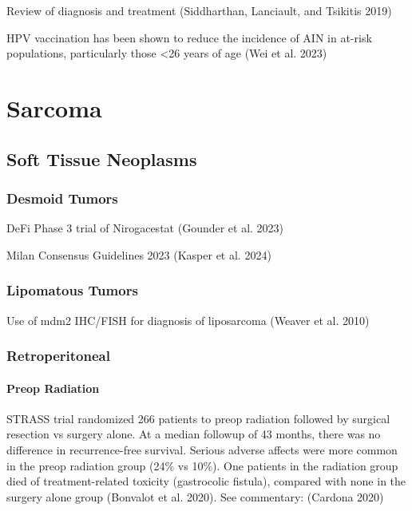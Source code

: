 \documentclass[
  letterpaper,
]{scrbook}
\begin{document}
Review of diagnosis and treatment (Siddharthan, Lanciault, and Tsikitis
2019)

HPV vaccination has been shown to reduce the incidence of AIN in at-risk
populations, particularly those \textless26 years of age (Wei et al.
2023)

\part{Sarcoma}

\chapter{Soft Tissue Neoplasms}\label{soft-tissue-neoplasms}

\section{Desmoid Tumors}\label{desmoid-tumors}

DeFi Phase 3 trial of Nirogacestat (Gounder et al. 2023)

Milan Consensus Guidelines 2023 (Kasper et al. 2024)

\section{Lipomatous Tumors}\label{lipomatous-tumors}

Use of mdm2 IHC/FISH for diagnosis of liposarcoma (Weaver et al. 2010)

\section{Retroperitoneal}\label{retroperitoneal}

\subsection{Preop Radiation}\label{preop-radiation}

STRASS trial randomized 266 patients to preop radiation followed by
surgical resection vs surgery alone. At a median followup of 43 months,
there was no difference in recurrence-free survival. Serious adverse
affects were more common in the preop radiation group (24\% vs 10\%).
One patients in the radiation group died of treatment-related toxicity
(gastrocolic fistula), compared with none in the surgery alone group
(Bonvalot et al. 2020). See commentary: (Cardona 2020)
\end{document}
